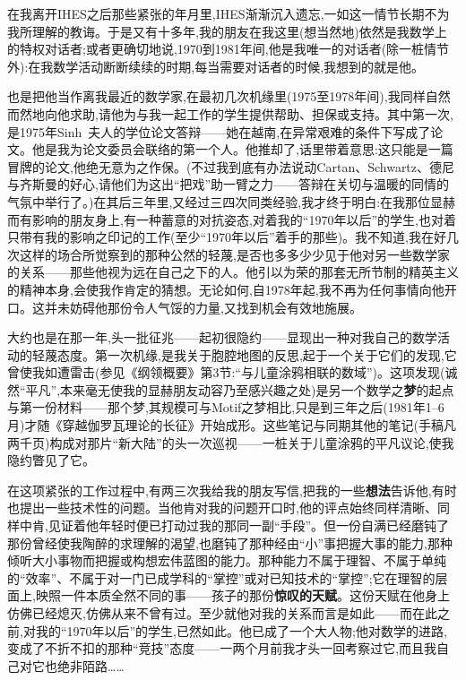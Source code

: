 在我离开IHES之后那些紧张的年月里,IHES渐渐沉入遗忘,一如这一情节长期不为我所理解的教诲。于是又有十多年,我的朋友在我这里(想当然地)依然是我数学上的特权对话者;或者更确切地说,1970到1981年间,他是我唯一的对话者(除一桩情节外):在我数学活动断断续续的时期,每当需要对话者的时候,我想到的就是他\dmark{}。

也是把他当作离我最近的数学家,在最初几次机缘里(1975至1978年间),我同样自然而然地向他求助,请他为与我一起工作的学生提供帮助、担保或支持。其中第一次,是1975年Sinh~夫人的学位论文答辩——她在越南,在异常艰难的条件下写成了论文。他是我为论文委员会联络的第一个人。他推却了,话里带着意思:这只能是一篇冒牌的论文,他绝无意为之作保。(不过我到底有办法说动Cartan、Schwartz、德尼与齐斯曼的好心,请他们为这出“把戏”助一臂之力——答辩在关切与温暖的同情的气氛中举行了。)在其后三年里,又经过三四次同类经验,我才终于明白:在我那位显赫而有影响的朋友身上,有一种蓄意的对抗姿态,对着我的“1970年以后”的学生,也对着只带有我的影响之印记的工作(至少“1970年以后”着手的那些)。我不知道,我在好几次这样的场合所觉察到的那种公然的轻蔑,是否也多多少少见于他对另一些数学家的关系——那些他视为远在自己之下的人。他引以为荣的那套无所节制的精英主义的精神本身,会使我作肯定的猜想。无论如何,自1978年起,我不再为任何事情向他开口。这并未妨碍他那份令人气馁的力量,又找到机会有效地施展。

大约也是在那一年,头一批征兆——起初很隐约——显现出一种对我自己的数学活动的轻蔑态度。第一次机缘,是我关于胞腔地图的反思,起于一个关于它们的发现,它曾使我如遭雷击(参见《纲领概要》第3节:“与儿童涂鸦相联的数域”)。这项发现(诚然“平凡”,本来毫无使我的显赫朋友动容乃至感兴趣之处)是另一个数学之\textbf{梦}的起点与第一份材料——那个梦,其规模可与Motif之梦相比,只是到三年之后(1981年1--6月)才随《穿越伽罗瓦理论的长征》开始成形。这些笔记与同期其他的笔记(手稿凡两千页)构成对那片“新大陆”的头一次巡视——一桩关于儿童涂鸦的平凡议论,使我隐约瞥见了它。

\dmark{}在这项紧张的工作过程中,有两三次我给我的朋友写信,把我的一些\textbf{想法}告诉他,有时也提出一些技术性的问题。当他肯对我的问题开口时,他的评点始终同样清晰、同样中肯,见证着他年轻时便已打动过我的那同一副“手段”。但一份自满已经磨钝了那份曾经使我陶醉的求理解的渴望,也磨钝了那种经由“小”事把握大事的能力,那种倾听大小事物而把握或构想宏伟蓝图的能力。那种能力不属于理智、不属于单纯的“效率”、不属于对一门已成学科的“掌控”或对已知技术的“掌控”;它在理智的层面上,映照一件本质全然不同的事——孩子的那份\textbf{惊叹的天赋}。这份天赋在他身上仿佛已经熄灭,仿佛从来不曾有过。至少就他对我的关系而言是如此——而在此之前,对我的“1970年以后”的学生,已然如此。他已成了一个大人物;他对数学的进路,变成了不折不扣的那种“竞技”态度——一两个月前我才头一回考察过它,而且我自己对它也绝非陌路……

